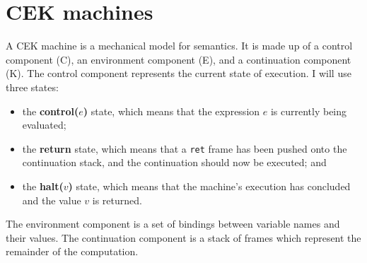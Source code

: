 \documentclass[12pt,a4paper,twoside,openright]{report}
\begin{document}
\section{CEK machines}\label{prepcek}

A CEK machine is a mechanical model for semantics. It is made up of a control component (C), an environment component (E), and a continuation component (K). The control component represents the current state of execution. I will use three states:

\begin{itemize}
\item the \textbf{control($e$)} state, which means that the expression $e$ is currently being evaluated;
\item the \textbf{return} state, which means that a \texttt{ret} frame has been pushed onto the continuation stack, and the continuation should now be executed; and
\item the \textbf{halt($v$)} state, which means that the machine's execution has concluded and the value $v$ is returned.
\end{itemize}

The environment component is a set of bindings between variable names and their values. The continuation component is a stack of frames which represent the remainder of the computation.
\end{document}

